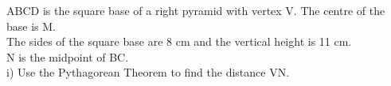 \documentclass[preview]{standalone}
\begin{document}
\begin{center}
\begin{minipage}{12cm}\raggedright ABCD is the square base of a right pyramid with vertex V. The centre of the base is M.\\ The sides of the square base are 8 cm and the vertical height is 11 cm.\\ N is the midpoint of BC.\\ i) Use the Pythagorean Theorem to find the distance VN.\end{minipage}
\end{center}
\end{document}
